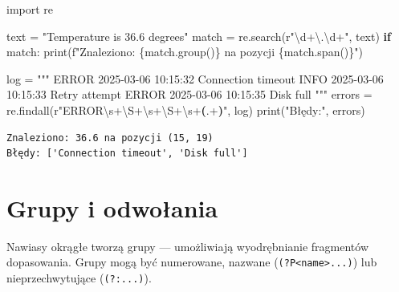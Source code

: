 \documentclass[
  polish,
  letterpaper,
  DIV=11,
  numbers=noendperiod]{scrreprt}
\newenvironment{Shaded}{\begin{snugshade}}{\end{snugshade}}
\newcommand{\BuiltInTok}[1]{\textcolor[rgb]{0.00,0.23,0.31}{#1}}
\newcommand{\CharTok}[1]{\textcolor[rgb]{0.13,0.47,0.30}{#1}}
\newcommand{\ControlFlowTok}[1]{\textcolor[rgb]{0.00,0.23,0.31}{\textbf{#1}}}
\newcommand{\DecValTok}[1]{\textcolor[rgb]{0.68,0.00,0.00}{#1}}
\newcommand{\ImportTok}[1]{\textcolor[rgb]{0.00,0.46,0.62}{#1}}
\newcommand{\KeywordTok}[1]{\textcolor[rgb]{0.00,0.23,0.31}{\textbf{#1}}}
\newcommand{\NormalTok}[1]{\textcolor[rgb]{0.00,0.23,0.31}{#1}}
\newcommand{\OperatorTok}[1]{\textcolor[rgb]{0.37,0.37,0.37}{#1}}
\newcommand{\SpecialCharTok}[1]{\textcolor[rgb]{0.37,0.37,0.37}{#1}}
\newcommand{\SpecialStringTok}[1]{\textcolor[rgb]{0.13,0.47,0.30}{#1}}
\newcommand{\StringTok}[1]{\textcolor[rgb]{0.13,0.47,0.30}{#1}}
\newcommand{\VerbatimStringTok}[1]{\textcolor[rgb]{0.13,0.47,0.30}{#1}}
\begin{document}
\begin{Shaded}
\begin{Highlighting}[]
\ImportTok{import}\NormalTok{ re}

\NormalTok{text }\OperatorTok{=} \StringTok{"Temperature is 36.6 degrees"}
\NormalTok{match }\OperatorTok{=}\NormalTok{ re.search(}\VerbatimStringTok{r"}\DecValTok{\textbackslash{}d}\OperatorTok{+}\CharTok{\textbackslash{}.}\DecValTok{\textbackslash{}d}\OperatorTok{+}\VerbatimStringTok{"}\NormalTok{, text)}
\ControlFlowTok{if}\NormalTok{ match:}
    \BuiltInTok{print}\NormalTok{(}\SpecialStringTok{f"Znaleziono: }\SpecialCharTok{\{}\NormalTok{match}\SpecialCharTok{.}\NormalTok{group()}\SpecialCharTok{\}}\SpecialStringTok{ na pozycji }\SpecialCharTok{\{}\NormalTok{match}\SpecialCharTok{.}\NormalTok{span()}\SpecialCharTok{\}}\SpecialStringTok{"}\NormalTok{)}

\NormalTok{log }\OperatorTok{=} \StringTok{"""}
\StringTok{ERROR 2025{-}03{-}06 10:15:32 Connection timeout}
\StringTok{INFO  2025{-}03{-}06 10:15:33 Retry attempt}
\StringTok{ERROR 2025{-}03{-}06 10:15:35 Disk full}
\StringTok{"""}
\NormalTok{errors }\OperatorTok{=}\NormalTok{ re.findall(}\VerbatimStringTok{r"ERROR}\DecValTok{\textbackslash{}s}\OperatorTok{+}\DecValTok{\textbackslash{}S}\OperatorTok{+}\DecValTok{\textbackslash{}s}\OperatorTok{+}\DecValTok{\textbackslash{}S}\OperatorTok{+}\DecValTok{\textbackslash{}s}\OperatorTok{+}\KeywordTok{(}\DecValTok{.}\OperatorTok{+}\KeywordTok{)}\VerbatimStringTok{"}\NormalTok{, log)}
\BuiltInTok{print}\NormalTok{(}\StringTok{"Błędy:"}\NormalTok{, errors)}
\end{Highlighting}
\end{Shaded}

\begin{verbatim}
Znaleziono: 36.6 na pozycji (15, 19)
Błędy: ['Connection timeout', 'Disk full']
\end{verbatim}

\section{Grupy i odwołania}\label{grupy-i-odwoux142ania}

Nawiasy okrągłe tworzą grupy --- umożliwiają wyodrębnianie fragmentów
dopasowania. Grupy mogą być numerowane, nazwane
(\texttt{(?P\textless{}name\textgreater{}...)}) lub nieprzechwytujące
(\texttt{(?:...)}).
\end{document}
